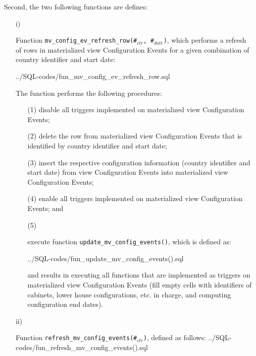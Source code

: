 Second, the two following functions are defines:
\begin{itemize}
\item[i)]{%
Function \texttt{\footnotesize mv\_config\_ev\_refresh\_row(\#$_{ctr}$, \#$_{date}$)}\label{fun_mv_config_ev_refresh}, which performs a refresh of rows in materialized view Configuration Events for a given combination of country identifier and start date:

%
{../SQL-codes/fun_mv_config_ev_refresh_row.sql}

The function performs the following procedures:
\begin{itemize}
\item[(1)]{disable all triggers implemented on materialized view Configuration Events;}
\item[(2)]{delete the row from materialized view Configuration Events that is identified by country identifier and start date;}
\item[(3)]{insert the respective configuration information (country identifier and start date) from view  Configuration Events into materialized view Configuration Events;}
\item[(4)]{enable all triggers implemented on materialized view Configuration Events; and}
\item[(5)]{execute function \texttt{\footnotesize update\_mv\_config\_events()}, which is defined as:

%
{../SQL-codes/fun_update_mv_config_events().sql}

and results in executing all functions that are implemented as triggers on materialized view Configuration Events (fill empty cells with identifiers of cabinets, lower house configurations, etc. in charge, and computing configuration end dates).}
\end{itemize}
}

\item[ii)]{%
Function \texttt{\footnotesize refresh\_mv\_config\_events(\#$_{ctr}$)}, defined as follows:
%
{../SQL-codes/fun_refresh_mv_config_events().sql}

}
\end{itemize}
